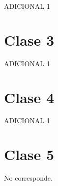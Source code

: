 \documentclass[12pt]{report}
\begin{document}
ADICIONAL 1

\section{Clase 3}

ADICIONAL 1
\section{Clase 4}

ADICIONAL 1


\section{Clase 5}

No corresponde.

\nocite{*}
 
\printbibliography

\appendix
%
%

\end{document}
